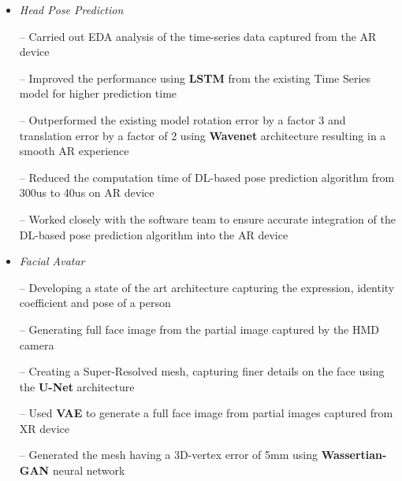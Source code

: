\documentclass{article}
\begin{document}
\begin{itemize}
\setlength{\itemsep} {-0.2em}
 \item\textit{Head Pose Prediction}
 \item[--] Carried out EDA analysis of the time-series data captured from the AR device

\item[--] Improved the performance  using \textbf{LSTM} from the existing Time Series model for higher prediction time
\item[--] Outperformed the existing model rotation error by a factor 3 and translation error by a factor of 2 using \textbf{Wavenet} architecture
resulting in a smooth AR experience
\item[--] Reduced the computation time of  DL-based pose prediction algorithm  from 300us to 40us on AR device  
\item[--] Worked closely with the software team to ensure accurate integration of the DL-based pose prediction algorithm into the AR device
 \item\textit{Facial Avatar}
   \item[--] Developing a state of the art architecture capturing  the expression, identity coefficient and pose of a person
   \item[--] Generating full face image from the partial image captured by the HMD camera
   \item[--] Creating a Super-Resolved mesh, capturing finer details on the face using the \textbf{U-Net} architecture
  \item[--] Used \textbf{VAE}  to generate a full face image from partial images captured from XR device  
   \item[--] Generated the mesh having a 3D-vertex error of 5mm
   using \textbf{Wassertian-GAN} neural network
   
\end{itemize}
\end{document}
